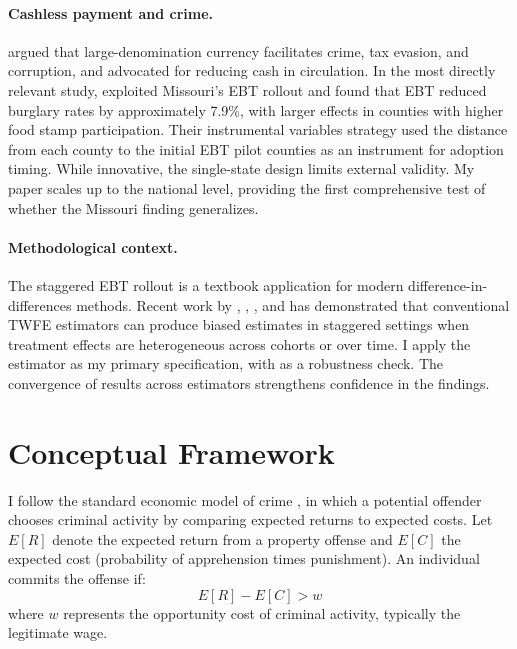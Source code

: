 \documentclass[12pt]{article}
\begin{document}
\paragraph{Cashless payment and crime.} \citet{rogoff2017curse} argued that large-denomination currency facilitates crime, tax evasion, and corruption, and advocated for reducing cash in circulation. In the most directly relevant study, \citet{wright2017less} exploited Missouri's EBT rollout and found that EBT reduced burglary rates by approximately 7.9\%, with larger effects in counties with higher food stamp participation. Their instrumental variables strategy used the distance from each county to the initial EBT pilot counties as an instrument for adoption timing. While innovative, the single-state design limits external validity. My paper scales up to the national level, providing the first comprehensive test of whether the Missouri finding generalizes.

\paragraph{Methodological context.} The staggered EBT rollout is a textbook application for modern difference-in-differences methods. Recent work by \citet{goodman2021difference}, \citet{dechaisemartin2020two}, \citet{sun2021estimating}, and \citet{callaway2021difference} has demonstrated that conventional TWFE estimators can produce biased estimates in staggered settings when treatment effects are heterogeneous across cohorts or over time. I apply the \citet{callaway2021difference} estimator as my primary specification, with \citet{sun2021estimating} as a robustness check. The convergence of results across estimators strengthens confidence in the findings.


\section{Conceptual Framework} \label{sec:framework}

I follow the standard economic model of crime \citep{becker1968crime, ehrlich1973participation}, in which a potential offender chooses criminal activity by comparing expected returns to expected costs. Let $E[R]$ denote the expected return from a property offense and $E[C]$ the expected cost (probability of apprehension times punishment). An individual commits the offense if:
\begin{equation}
E[R] - E[C] > w
\end{equation}
where $w$ represents the opportunity cost of criminal activity, typically the legitimate wage.
\end{document}
